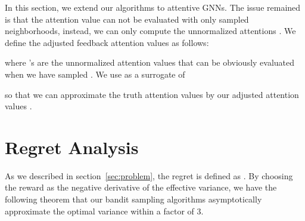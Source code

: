\documentclass{article}
\begin{document}
In this section, we extend our algorithms to
attentive GNNs.
The issue remained is that the attention value  
can not be evaluated with only sampled neighborhoods,
instead, we can only compute the unnormalized attentions .
We define the adjusted feedback attention values as follows:

where 's are the unnormalized attention values that can be obviously
evaluated when we have sampled .
We use  as a surrogate of 

so that we can approximate the truth attention values  by our
adjusted attention values .


\begin{comment}
\begin{algorithm*}[ht]
\caption{Node-wise bandit sampling}
\label{alg:node_wise_algo}
\begin{algorithmic}[1]
\Require , sample size , neighbor size , 
\State \textbf{Initialize:} , 
, 
,

\For { to }
	\State Take a minibatch of nodes in the last layer, 
then sample  neighbors in layer  for each node  in layer , with
		.
	\State Update model to receive rewards in the last layer:
.
	\State For  set
	
	
	\If {}
		\State Decide  so as to satisfy
		
		\State Set  and  for  
                \Else
		\State Set 
                \EndIf
	\State Set
		
	\State Set
		 for
		
\EndFor
\end{algorithmic}
\end{algorithm*}
\end{comment}


\section{Regret Analysis}\label{sec:regret_analysis}
As we described in section~\ref{sec:problem}, the regret is defined as . By choosing the reward as the negative derivative of the effective variance, we have the following theorem that our bandit sampling algorithms asymptotically approximate the optimal variance within a factor of 3.
\end{document}
